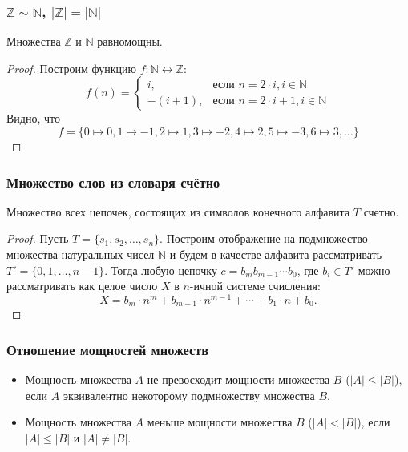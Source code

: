 \begin{frame}
    \frametitle{$\mathbb{Z}\sim\mathbb{N}$, $|\mathbb{Z}|=|\mathbb{N}|$}
    \begin{example}
        Множества $\mathbb{Z}$ и $\mathbb{N}$ \alert{равномощны}.
    \end{example}
    \begin{proof}
        Построим функцию $f:\mathbb{N}\leftrightarrow\mathbb{Z}$:
        \[
            f(n)=
            \begin{cases}
                 i,     &\text{если $n=2\cdot i, i\in\mathbb{N}$}\\
                -(i+1), &\text{если $n=2\cdot i+1, i\in\mathbb{N}$}
            \end{cases}
        \]
        Видно, что 
        \[
            f=\{0\mapsto 0,1\mapsto -1,2\mapsto 1,3\mapsto -2,4\mapsto 2,5\mapsto-3,6\mapsto 3,\ldots\}
        \]
    \end{proof}
\end{frame}

\begin{frame}
    \frametitle{Множество слов из словаря счётно}
    
    \begin{example}
        Множество всех цепочек, состоящих из символов конечного алфавита $T$ счетно.
    \end{example}
    \begin{proof}
        Пусть $T=\{s_1,s_2,\ldots,s_n\}$. Построим отображение на подмножество множества натуральных чисел $\mathbb{N}$ и будем в качестве алфавита рассматривать $T'=\{0,1,\ldots,n-1\}$. Тогда любую цепочку $c=b_mb_{m-1}\cdots b_0$, где $b_i\in T'$ можно рассматривать как целое число $X$ в $n$-ичной системе счисления:
        \[
            X=b_m\cdot n^m + b_{m-1}\cdot n^{m-1} + \cdots + b_1\cdot n + b_0.
        \]
    \end{proof}
\end{frame}

\begin{frame}
    \frametitle{Отношение мощностей множеств}
    
    \begin{definition}
        \begin{itemize}
            \item Мощность множества $A$ \alert{не превосходит} мощности множества $B$ ($|A|\leq|B|$), если $A$ эквивалентно некоторому подмножеству множества $B$. 
        
            \item Мощность множества $A$ \alert{меньше} мощности множества $B$ ($|A|<|B|$), если $|A|\leq|B|$ и $|A|\neq|B|$.
        \end{itemize}
    \end{definition}
\end{frame}

